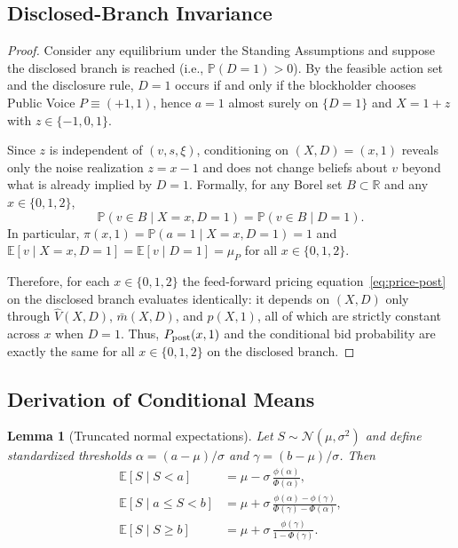 \documentclass[11pt]{article}
\newtheorem{lemma}{Lemma}
\newcommand{\E}{\mathbb{E}}
\newcommand{\PP}{\mathbb{P}}
\newcommand{\1}{\mathbf{1}}
\newcommand{\R}{\mathbb{R}}
\begin{document}
\subsection{Disclosed-Branch Invariance}
\label{app:proof-disclosed-invariance}

\begin{proof}
Consider any equilibrium under the Standing Assumptions and suppose the disclosed branch is reached (i.e., $\PP(D=1)>0$). By the feasible action set and the disclosure rule, $D=1$ occurs if and only if the blockholder chooses Public Voice $P\equiv(+1,1)$, hence $a=1$ almost surely on $\{D=1\}$ and $X=1+z$ with $z\in\{-1,0,1\}$.

Since $z$ is independent of $(v,s,\xi)$, conditioning on $(X,D)=(x,1)$ reveals only the noise realization $z=x-1$ and does not change beliefs about $v$ beyond what is already implied by $D=1$. Formally, for any Borel set $B\subset\R$ and any $x\in\{0,1,2\}$,
\[
\PP(v\in B \mid X=x,D=1)=\PP(v\in B \mid D=1).
\]
In particular, $\pi(x,1)=\PP(a=1 \mid X=x,D=1)=1$ and $\E[v \mid X=x,D=1]=\E[v \mid D=1]=\mu_P$ for all $x\in\{0,1,2\}$.

Therefore, for each $x\in\{0,1,2\}$ the feed-forward pricing equation~\eqref{eq:price-post} on the disclosed branch evaluates identically: it depends on $(X,D)$ only through $\hat V(X,D)$, $\bar{m}(X,D)$, and $p(X,1)$, all of which are strictly constant across $x$ when $D=1$. Thus, $P_{\textup{post}}(x,1)$ and the conditional bid probability are exactly the same for all $x\in\{0,1,2\}$ on the disclosed branch.
\end{proof}

\subsection{Derivation of Conditional Means}
\label{app:deriv-conditional-means}

\begin{lemma}[Truncated normal expectations]
\label{lem:truncnorm}
Let $S\sim\mathcal{N}(\mu,\sigma^2)$ and define standardized thresholds $\alpha=(a-\mu)/\sigma$ and $\gamma=(b-\mu)/\sigma$. Then
\begin{align*}
\E[S \mid S<a] &= \mu - \sigma\,\frac{\phi(\alpha)}{\Phi(\alpha)}, \\
\E[S \mid a\le S<b] &= \mu + \sigma\,\frac{\phi(\alpha)-\phi(\gamma)}{\Phi(\gamma)-\Phi(\alpha)}, \\
\E[S \mid S\ge b] &= \mu + \sigma\,\frac{\phi(\gamma)}{1-\Phi(\gamma)}.
\end{align*}
\end{lemma}
\end{document}
